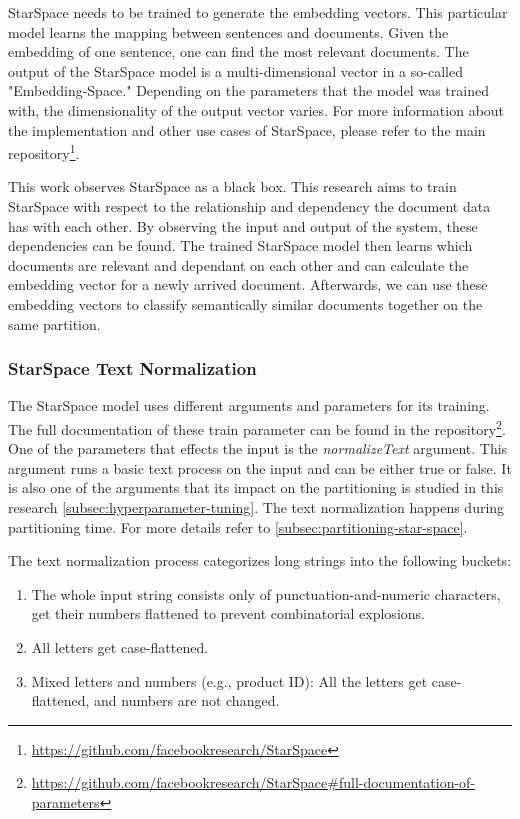 StarSpace needs to be trained to generate the embedding vectors. This particular model learns the mapping between sentences and documents. Given the embedding of one sentence, one can find the most relevant documents. The output of the StarSpace model is a multi-dimensional vector in a so-called "Embedding-Space." Depending on the parameters that the model was trained with, the dimensionality of the output vector varies. For more information about the implementation and other use cases of StarSpace, please refer to the main repository\footnote{\url{https://github.com/facebookresearch/StarSpace}}.


This work observes StarSpace as a black box. This research aims to train StarSpace with respect to the relationship and dependency the document data has with each other. By observing the input and output of the system, these dependencies can be found. The trained StarSpace model then learns which documents are relevant and dependant on each other and can calculate the embedding vector for a newly arrived document. Afterwards, we can use these embedding vectors to classify semantically similar documents together on the same partition.

\subsubsection{StarSpace Text Normalization}
\label{subsubsec:star-space-text-normalization}
The StarSpace model uses different arguments and parameters for its training. The full documentation of these train parameter can be found in the repository\footnote{\url{https://github.com/facebookresearch/StarSpace\#full-documentation-of-parameters}}. One of the parameters that effects the input is the \emph{normalizeText} argument. This argument runs a basic text process on the input and can be either true or false. It is also one of the arguments that its impact on the partitioning is studied in this research \ref{subsec:hyperparameter-tuning}. The text normalization happens during partitioning time. For more details refer to \ref{subsec:partitioning-star-space}.


The text normalization process categorizes long strings into the following buckets:

\begin{enumerate}
    \item The whole input string consists only of punctuation-and-numeric characters, get their numbers flattened to prevent combinatorial explosions.
    \item All letters get case-flattened.
    \item Mixed letters and numbers (e.g., product ID): All the letters get case-flattened, and numbers are not changed.
\end{enumerate}

